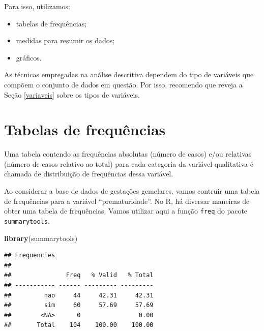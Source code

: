 \documentclass[
]{book}
\newenvironment{Shaded}{\begin{snugshade}}{\end{snugshade}}
\newcommand{\DataTypeTok}[1]{\textcolor[rgb]{0.13,0.29,0.53}{#1}}
\newcommand{\KeywordTok}[1]{\textcolor[rgb]{0.13,0.29,0.53}{\textbf{#1}}}
\newcommand{\NormalTok}[1]{#1}
\newcommand{\OperatorTok}[1]{\textcolor[rgb]{0.81,0.36,0.00}{\textbf{#1}}}
\newcommand{\OtherTok}[1]{\textcolor[rgb]{0.56,0.35,0.01}{#1}}
\providecommand{\tightlist}{%
  \setlength{\itemsep}{0pt}\setlength{\parskip}{0pt}}
\begin{document}
Para isso, utilizamos:

\begin{itemize}
\tightlist
\item
  tabelas de frequências;
\item
  medidas para resumir os dados;
\item
  gráficos.
\end{itemize}

As técnicas empregadas na análise descritiva dependem do tipo de variáveis que compõem o conjunto de dados em questão. Por isso, recomendo que reveja a Seção \ref{variaveis} sobre os tipos de variáveis.

\hypertarget{tabelas-de-frequuxeancias}{%
\section{Tabelas de frequências}\label{tabelas-de-frequuxeancias}}

Uma tabela contendo as frequências absolutas (número de casos) e/ou relativas (número de casos relativo ao total) para cada categoria da variável qualitativa é chamada de distribuição de frequências dessa variável.

Ao considerar a base de dados de gestações gemelares, vamos contruir uma tabela de frequências para a variável ``prematuridade''. No R, há diversar maneiras de obter uma tabela de frequências. Vamos utilizar aqui a função \texttt{freq} do pacote \texttt{summarytools}.

\begin{Shaded}
\begin{Highlighting}[]
\KeywordTok{library}\NormalTok{(summarytools)}
\end{Highlighting}
\end{Shaded}

\begin{Shaded}
\end{Shaded}

\begin{verbatim}
## Frequencies  
## 
##               Freq   % Valid   % Total
## ----------- ------ --------- ---------
##         nao     44     42.31     42.31
##         sim     60     57.69     57.69
##        <NA>      0                0.00
##       Total    104    100.00    100.00
\end{verbatim}
\end{document}
